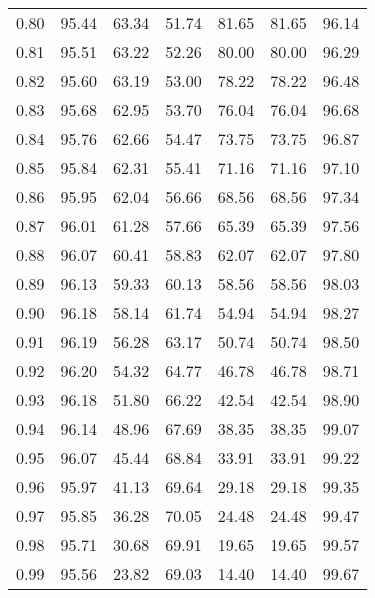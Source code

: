 \begin{tabular}{|c|c|c|c|c|c|c|}
      0.80 &     95.44 &     63.34 &      51.74 &   81.65 &      81.65 &         96.14 \\
      0.81 &     95.51 &     63.22 &      52.26 &   80.00 &      80.00 &         96.29 \\
      0.82 &     95.60 &     63.19 &      53.00 &   78.22 &      78.22 &         96.48 \\
      0.83 &     95.68 &     62.95 &      53.70 &   76.04 &      76.04 &         96.68 \\
      0.84 &     95.76 &     62.66 &      54.47 &   73.75 &      73.75 &         96.87 \\
      0.85 &     95.84 &     62.31 &      55.41 &   71.16 &      71.16 &         97.10 \\
      0.86 &     95.95 &     62.04 &      56.66 &   68.56 &      68.56 &         97.34 \\
      0.87 &     96.01 &     61.28 &      57.66 &   65.39 &      65.39 &         97.56 \\
      0.88 &     96.07 &     60.41 &      58.83 &   62.07 &      62.07 &         97.80 \\
      0.89 &     96.13 &     59.33 &      60.13 &   58.56 &      58.56 &         98.03 \\
      0.90 &     96.18 &     58.14 &      61.74 &   54.94 &      54.94 &         98.27 \\
      0.91 &     96.19 &     56.28 &      63.17 &   50.74 &      50.74 &         98.50 \\
      0.92 &     96.20 &     54.32 &      64.77 &   46.78 &      46.78 &         98.71 \\
      0.93 &     96.18 &     51.80 &      66.22 &   42.54 &      42.54 &         98.90 \\
      0.94 &     96.14 &     48.96 &      67.69 &   38.35 &      38.35 &         99.07 \\
      0.95 &     96.07 &     45.44 &      68.84 &   33.91 &      33.91 &         99.22 \\
      0.96 &     95.97 &     41.13 &      69.64 &   29.18 &      29.18 &         99.35 \\
      0.97 &     95.85 &     36.28 &      70.05 &   24.48 &      24.48 &         99.47 \\
      0.98 &     95.71 &     30.68 &      69.91 &   19.65 &      19.65 &         99.57 \\
      0.99 &     95.56 &     23.82 &      69.03 &   14.40 &      14.40 &         99.67 \\
\bottomrule
\end{tabular}
